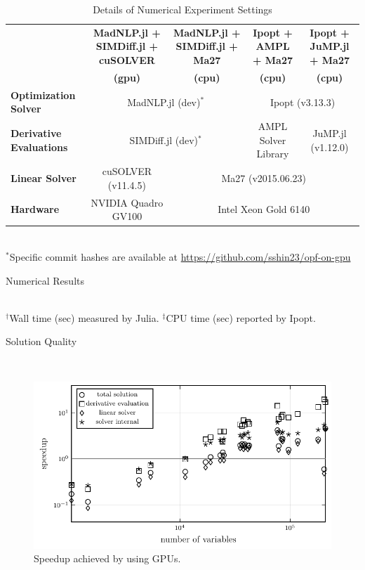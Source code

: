 \begin{table}[t]
  \scriptsize
  \centering
  \caption{Details of Numerical Experiment Settings}
  \begin{tabular}{|l|c|c|c|c|} 
    \hline
    & {\textbf{MadNLP.jl + SIMDiff.jl + cuSOLVER}} 
    & {\textbf{MadNLP.jl + SIMDiff.jl + Ma27}} 
    & {\textbf{Ipopt + AMPL + Ma27}}
    & {\textbf{Ipopt + JuMP.jl + Ma27}}\\
    &\textbf{(gpu)} &\textbf{(cpu)} &\textbf{(cpu)}& \textbf{(cpu)}\\
    \hline
    \textbf{Optimization Solver} & \multicolumn{2}{c|}{MadNLP.jl (dev)$^*$} & \multicolumn{2}{c|}{Ipopt (v3.13.3)} \\
    \hline
    \textbf{Derivative Evaluations} & \multicolumn{2}{c|}{SIMDiff.jl (dev)$^*$} &  AMPL Solver Library & JuMP.jl (v1.12.0)\\
    \hline
    \textbf{Linear Solver} &  cuSOLVER (v11.4.5) &\multicolumn{3}{c|}{Ma27 (v2015.06.23)}\\
    \hline
    \textbf{Hardware} & NVIDIA Quadro GV100 & \multicolumn{3}{c|}{Intel Xeon Gold 6140}\\ 
    \hline
  \end{tabular}\\
  $^*$Specific commit hashes are available at \url{https://github.com/sshin23/opf-on-gpu}
  \label{tbl:settings} 
\end{table}
\begin{table}[t]
  \scriptsize 
  \centering
  \caption{Numerical Results}
  \\
  $^\dag$Wall time (sec) measured by Julia. $^\ddag$CPU time (sec) reported by Ipopt.
  \label{tbl:results}
\end{table}
\begin{table}[t]
  \scriptsize
  \centering
  \caption{Solution Quality}
  \label{tbl:quality}
  \\
\end{table}
\begin{figure}[t]
  \includegraphics[width=.45\textwidth]{speedup-sol.pdf}
  \caption{Speedup achieved by using GPUs.}
  \label{fig:speedup}
\end{figure}



